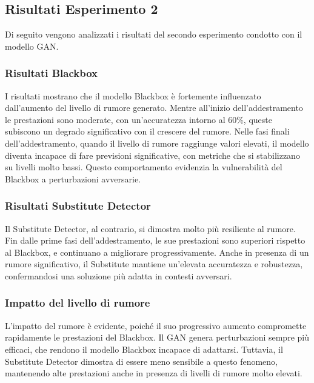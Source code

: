 \subsection{Risultati Esperimento 2}
Di seguito vengono analizzati i risultati del secondo esperimento condotto con il modello GAN.
\subsubsection{Risultati Blackbox}
I risultati mostrano che il modello Blackbox è fortemente influenzato dall'aumento del livello di rumore generato. Mentre all'inizio dell'addestramento le prestazioni sono moderate, con un'accuratezza intorno al 60\%, queste subiscono un degrado significativo con il crescere del rumore. Nelle fasi finali dell'addestramento, quando il livello di rumore raggiunge valori elevati, il modello diventa incapace di fare previsioni significative, con metriche che si stabilizzano su livelli molto bassi. Questo comportamento evidenzia la vulnerabilità del Blackbox a perturbazioni avversarie.
\subsubsection{Risultati Substitute Detector}
Il Substitute Detector, al contrario, si dimostra molto più resiliente al rumore. Fin dalle prime fasi dell'addestramento, le sue prestazioni sono superiori rispetto al Blackbox, e continuano a migliorare progressivamente. Anche in presenza di un rumore significativo, il Substitute mantiene un'elevata accuratezza e robustezza, confermandosi una soluzione più adatta in contesti avversari.
\subsubsection{Impatto del livello di rumore}
L'impatto del rumore è evidente, poiché il suo progressivo aumento compromette rapidamente le prestazioni del Blackbox. Il GAN genera perturbazioni sempre più efficaci, che rendono il modello Blackbox incapace di adattarsi. Tuttavia, il Substitute Detector dimostra di essere meno sensibile a questo fenomeno, mantenendo alte prestazioni anche in presenza di livelli di rumore molto elevati.
